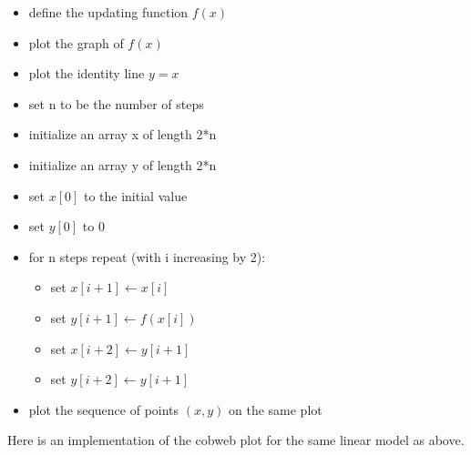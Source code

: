\documentclass[
  letterpaper,
  DIV=11,
  numbers=noendperiod]{scrreprt}
\providecommand{\tightlist}{%
  \setlength{\itemsep}{0pt}\setlength{\parskip}{0pt}}\usepackage{longtable,booktabs,array}
\begin{document}
\begin{tcolorbox}[enhanced jigsaw, colbacktitle=quarto-callout-tip-color!10!white, leftrule=.75mm, coltitle=black, left=2mm, breakable, opacityback=0, colback=white, toprule=.15mm, opacitybacktitle=0.6, bottomtitle=1mm, colframe=quarto-callout-tip-color-frame, rightrule=.15mm, bottomrule=.15mm, toptitle=1mm, titlerule=0mm, arc=.35mm, title={Cobweb plot pseudocode}]

\begin{itemize}
\tightlist
\item
  define the updating function \(f(x)\)
\item
  plot the graph of \(f(x)\)
\item
  plot the identity line \(y=x\)
\item
  set n to be the number of steps
\item
  initialize an array x of length 2*n
\item
  initialize an array y of length 2*n
\item
  set \(x[0]\) to the initial value
\item
  set \(y[0]\) to 0
\item
  for n steps repeat (with i increasing by 2):

  \begin{itemize}
  \tightlist
  \item
    set \(x[i+1] \gets x[i]\)
  \item
    set \(y[i+1] \gets f(x[i])\)
  \item
    set \(x[i+2] \gets y[i+1]\)
  \item
    set \(y[i+2] \gets y[i+1]\)
  \end{itemize}
\item
  plot the sequence of points \((x,y)\) on the same plot
\end{itemize}

\end{tcolorbox}

Here is an implementation of the cobweb plot for the same linear model
as above.
\end{document}
